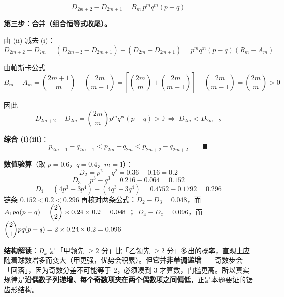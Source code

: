\begin{answer}
\nopagebreak[4]
\[D_{2m+2}-D_{2m+1}=B_m\,p^mq^m(p-q)\tag{ii}\]

\par\medskip

\textbf{第三步：合并（组合恒等式收尾）。}

由 (ii) 减去 (i)：
\nopagebreak[4]
\[D_{2m+2}-D_{2m}=\left(D_{2m+2}-D_{2m+1}\right)-\left(D_{2m}-D_{2m+1}\right)=p^mq^m(p-q)\left(B_m-A_m\right)\]

由帕斯卡公式
\nopagebreak[4]
\[B_m-A_m=\binom{2m+1}{m}-\binom{2m}{m-1}=\left[\binom{2m}{m}+\binom{2m}{m-1}\right]-\binom{2m}{m-1}=\binom{2m}{m}>0\]

因此
\nopagebreak[4]
\[D_{2m+2}-D_{2m}=\binom{2m}{m}p^mq^m(p-q)>0\ \Longrightarrow\ \boxed{D_{2m}<D_{2m+2}}\tag{iii}\]

\textbf{综合 (i)(iii)}：
\nopagebreak[4]
\[p_{2m+1}-q_{2m+1}<p_{2m}-q_{2m}<p_{2m+2}-q_{2m+2}\qquad\blacksquare\]


\begin{gktip}
\textbf{数值验算}（取 $p=0.6$，$q=0.4$，$m=1$）：
\nopagebreak[4]
\[D_2=p^2-q^2=0.36-0.16=0.2\]
\nopagebreak[4]
\[D_3=p^3-q^3=0.216-0.064=0.152\]
\nopagebreak[4]
\[D_4=\left(4p^3-3p^4\right)-\left(4q^3-3q^4\right)=0.4752-0.1792=0.296\]
链条 $0.152<0.2<0.296$ 
再核对两条公式：$D_2-D_3=0.048$，而 $A_1p q(p-q)=\dbinom22\times0.24\times0.2=0.048$ ；
$D_4-D_2=0.096$，而 $\dbinom21pq(p-q)=2\times0.24\times0.2=0.096$ 

\textbf{结构解读}：$D_k$ 是「甲领先 $\ge2$ 分」比「乙领先 $\ge2$ 分」多出的概率，直观上应随着球数增多而变大（甲更强，优势会积累）。但\textbf{它并非单调递增}——奇数步会「回落」，因为奇数分差不可能等于 $2$，必须凑到 $3$ 才算数，门槛更高。所以真实规律是\textbf{沿偶数子列递增、每个奇数项夹在两个偶数项之间偏低}，正是本题要证的锯齿形结构。
\end{gktip}




\end{answer}